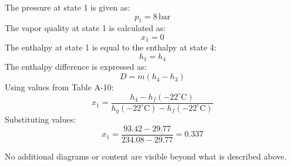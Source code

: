 The pressure at state 1 is given as:  
\[
p_1 = 8 \, \text{bar}
\]  
The vapor quality at state 1 is calculated as:  
\[
x_1 = 0
\]  
The enthalpy at state 1 is equal to the enthalpy at state 4:  
\[
h_1 = h_4
\]  
The enthalpy difference is expressed as:  
\[
D = \dot{m}(h_4 - h_3)
\]  
Using values from Table A-10:  
\[
x_1 = \frac{h_4 - h_f(-22^\circ\text{C})}{h_g(-22^\circ\text{C}) - h_f(-22^\circ\text{C})}
\]  
Substituting values:  
\[
x_1 = \frac{93.42 - 29.77}{234.08 - 29.77} = 0.337
\]  

No additional diagrams or content are visible beyond what is described above.
